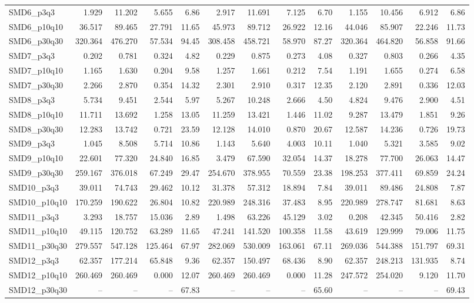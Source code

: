 \begin{longtable}{lrrrrrrrrrrrr}
SMD6\_p3q3 & 1.929 & 11.202 & 5.655 & 6.86 & 2.917 & 11.691 & 7.125 & 6.70 & 1.155 & 10.456 & 6.912 & 6.86 \\
SMD6\_p10q10 & 36.517 & 89.465 & 27.791 & 11.65 & 45.973 & 89.712 & 26.922 & 12.16 & 44.046 & 85.907 & 22.246 & 11.73 \\
SMD6\_p30q30 & 320.364 & 476.270 & 57.534 & 94.45 & 308.458 & 458.721 & 58.970 & 87.27 & 320.364 & 464.820 & 56.858 & 91.66 \\
SMD7\_p3q3 & 0.202 & 0.781 & 0.324 & 4.82 & 0.229 & 0.875 & 0.273 & 4.08 & 0.327 & 0.803 & 0.266 & 4.35 \\
SMD7\_p10q10 & 1.165 & 1.630 & 0.204 & 9.58 & 1.257 & 1.661 & 0.212 & 7.54 & 1.191 & 1.655 & 0.274 & 6.58 \\
SMD7\_p30q30 & 2.266 & 2.870 & 0.354 & 14.32 & 2.301 & 2.910 & 0.317 & 12.35 & 2.120 & 2.891 & 0.336 & 12.03 \\
SMD8\_p3q3 & 5.734 & 9.451 & 2.544 & 5.97 & 5.267 & 10.248 & 2.666 & 4.50 & 4.824 & 9.476 & 2.900 & 4.51 \\
SMD8\_p10q10 & 11.711 & 13.692 & 1.258 & 13.05 & 11.259 & 13.421 & 1.446 & 11.02 & 9.287 & 13.479 & 1.851 & 9.26 \\
SMD8\_p30q30 & 12.283 & 13.742 & 0.721 & 23.59 & 12.128 & 14.010 & 0.870 & 20.67 & 12.587 & 14.236 & 0.726 & 19.73 \\
SMD9\_p3q3 & 1.045 & 8.508 & 5.714 & 10.86 & 1.143 & 5.640 & 4.003 & 10.11 & 1.040 & 5.321 & 3.585 & 9.02 \\
SMD9\_p10q10 & 22.601 & 77.320 & 24.840 & 16.85 & 3.479 & 67.590 & 32.054 & 14.37 & 18.278 & 77.700 & 26.063 & 14.47 \\
SMD9\_p30q30 & 259.167 & 376.018 & 67.249 & 29.47 & 254.670 & 378.955 & 70.559 & 23.38 & 198.253 & 377.411 & 69.859 & 24.24 \\
SMD10\_p3q3 & 39.011 & 74.743 & 29.462 & 10.12 & 31.378 & 57.312 & 18.894 & 7.84 & 39.011 & 89.486 & 24.808 & 7.87 \\
SMD10\_p10q10 & 170.259 & 190.622 & 26.804 & 10.82 & 220.989 & 248.316 & 37.483 & 8.95 & 220.989 & 278.747 & 81.681 & 8.63 \\
SMD11\_p3q3 & 3.293 & 18.757 & 15.036 & 2.89 & 1.498 & 63.226 & 45.129 & 3.02 & 0.208 & 42.345 & 50.416 & 2.82 \\
SMD11\_p10q10 & 49.115 & 120.752 & 63.289 & 11.65 & 47.241 & 141.520 & 100.358 & 11.58 & 43.619 & 129.999 & 79.006 & 11.75 \\
SMD11\_p30q30 & 279.557 & 547.128 & 125.464 & 67.97 & 282.069 & 530.009 & 163.061 & 67.11 & 269.036 & 544.388 & 151.797 & 69.31 \\
SMD12\_p3q3 & 62.357 & 177.214 & 65.848 & 9.36 & 62.357 & 150.497 & 68.436 & 8.90 & 62.357 & 248.213 & 131.935 & 8.74 \\
SMD12\_p10q10 & 260.469 & 260.469 & 0.000 & 12.07 & 260.469 & 260.469 & 0.000 & 11.28 & 247.572 & 254.020 & 9.120 & 11.70 \\
SMD12\_p30q30 & -- & -- & -- & 67.83 & -- & -- & -- & 65.60 & -- & -- & -- & 69.43 \\
\end{longtable}
\endgroup

